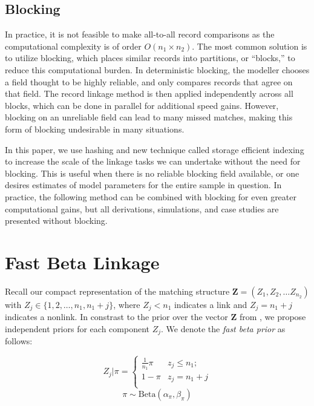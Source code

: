 \documentclass[12pt,letterpaper]{article}
\newcommand{\1}[1]{\mathbb{I}\!\left[#1\right]} %
\begin{document}
\subsection{Blocking}

In practice, it is not feasible to make all-to-all record comparisons as the computational complexity is of order $O(n_1 \times n_2).$ The most common solution is to utilize blocking, which places similar records into partitions, or ``blocks,'' to reduce this computational burden. In deterministic blocking, the modeller chooses a field thought to be highly reliable, and only compares records that agree on that field. The record linkage method is then applied independently across all blocks, which can be done in parallel for additional speed gains. However, blocking on an unreliable field can lead to many missed matches, making this form of blocking undesirable in many situations.

In this paper, we use hashing and new technique called storage efficient indexing to increase the scale of the linkage tasks we can undertake without the need for blocking. This is useful when there is no reliable blocking field available, or one desires estimates of model parameters for the entire sample in question. In practice, the following method can be combined with blocking for even greater computational gains, but all derivations, simulations, and case studies are presented without blocking. 

\section{Fast Beta Linkage}
\label{sec:fast-beta-linkage}

Recall our compact representation of the matching structure $\bm{Z} = (Z_1, Z_2, \ldots Z_{n_2})$ with $Z_j \in \{1,2, \ldots, n_1, n_1 + j\}$, where $Z_j < n_1$ indicates a link and $Z_j = n_1 + j$ indicates a nonlink. In constrast to the prior over the vector $\bm{Z}$ from \cite{sadinle_bayesian_2017}, we propose independent priors for each component $Z_j$. We denote the \emph{fast beta prior} as follows:


$$Z_j | \pi =
\begin{cases} 
	\frac{1}{n_1}\pi  & z_j \leq n_1; \\
	1-\pi &  z_j  = n_1 + j \\
\end{cases}$$
$$\pi \sim \text{Beta}(\alpha_{\pi}, \beta_{\pi})$$
\end{document}
